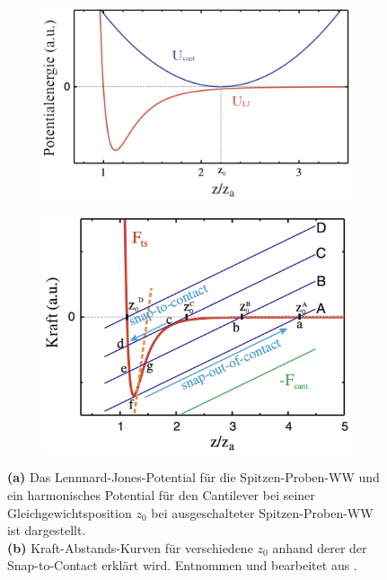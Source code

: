    \begin{figure}[H]
        \centering
        \begin{subfigure}{0.49\textwidth}
            \includegraphics[width = \textwidth]{bilder/Snap_to_Contact_Potential.png}
            \caption{}
            \label{fig:Snap_to_Contact_Potential}
        \end{subfigure}
        \hfill
        \begin{subfigure}{0.49\textwidth}
            \includegraphics[width = \textwidth]{bilder/Snap_to_Contact_Kraft.png}
            \caption{}
            \label{fig:Snap_to_Contact_Kraft}
        \end{subfigure}
        \caption{\textbf{(a)} Das Lennnard-Jones-Potential für die Spitzen-Proben-WW und ein harmonisches Potential für den Cantilever bei seiner Gleichgewichtsposition $z_0$ bei ausgeschalteter Spitzen-Proben-WW ist dargestellt. \\ \textbf{(b)} Kraft-Abstands-Kurven für verschiedene $z_0$ anhand derer der Snap-to-Contact erklärt wird. Entnommen und bearbeitet aus \cite{voigtlaender}.}
        \label{fig:Snap_to_Contact}
    \end{figure}
